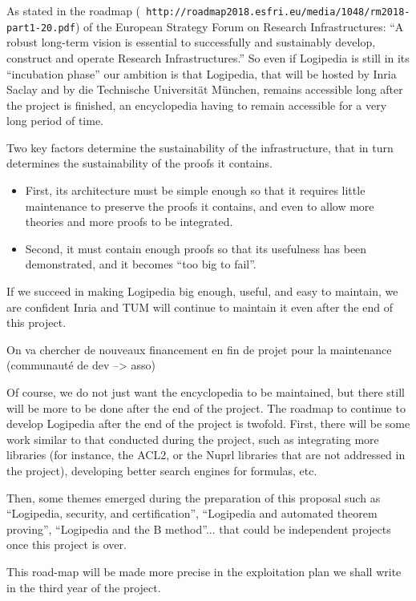As stated in the roadmap ({\tt
  http://roadmap2018.esfri.eu/media/1048/rm2018-part1-20.pdf}) of the
European Strategy Forum on Research Infrastructures: ``A robust
long-term vision is essential to successfully and sustainably develop,
construct and operate Research Infrastructures.''  So even if
Logipedia is still in its ``incubation phase'' our ambition is that
Logipedia, that will be hosted by Inria Saclay and by die Technische
Universität München, remains accessible long after the project is
finished, an encyclopedia having to remain accessible for a very long
period of time.

Two key factors determine the sustainability of the infrastructure,
that in turn determines the sustainability of the proofs it contains.
\begin{itemize}
\item First, its architecture must be simple enough so that it requires
  little maintenance to preserve the proofs it contains, and even to
  allow more theories and more proofs to be integrated.
\item Second, it must contain enough proofs so that its usefulness has been
demonstrated, and it becomes ``too big to fail''.
\end{itemize}

If we succeed in making Logipedia big enough, useful, and easy to
maintain, we are confident Inria and TUM will continue to maintain it
even after the end of this project.

{\color{red} On va chercher de nouveaux financement en fin de projet
  pour la maintenance (communauté de dev --> asso)}

Of course, we do not just want the encyclopedia to be maintained, but
there still will be more to be done after the end of the project. The
roadmap to continue to develop Logipedia after the end of the project
is twofold. First, there will be some work similar to that conducted
during the project, such as integrating more libraries (for instance,
the ACL2, or the Nuprl libraries that are not addressed in the
project), developing better search engines for formulas, etc.

Then, some themes emerged during the preparation of this proposal such
as ``Logipedia, security, and certification'', ``Logipedia and
automated theorem proving'', ``Logipedia and the B method''... that
could be independent projects once this project is over.

This road-map will be made more precise in the exploitation plan
we shall write in the third year of the project.

